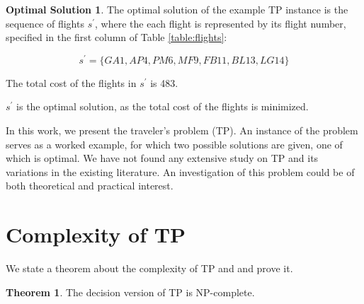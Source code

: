 \documentclass{article}
\theoremstyle{definition}
\newtheorem{theorem}{Theorem}
\newtheorem*{osolution}{Optimal Solution}
\begin{document}
\begin{osolution}
The optimal solution of the example TP instance is the sequence of flights $s^{\prime}$, where the each flight is represented by its flight number, specified in the first column of Table \ref{table:flights}:

$$ s^{\prime} = \{GA1, AP4, PM6, MF9, FB11, BL13, LG14\} $$

The total cost of the flights in $s^{\prime}$ is 483.

$s^{\prime}$ is the optimal solution, as the total cost of the flights is minimized.
\end{osolution}

In this work, we present the traveler's problem (TP). An instance of the problem serves as a worked example, for which two possible solutions are given, one of which is optimal. We have not found any extensive study on TP and its variations in the existing literature. An investigation of this problem could be of both theoretical and practical interest.

\section{Complexity of TP}

We state a theorem about the complexity of TP and and prove it.

\begin{theorem}
The decision version of TP is NP-complete.
\end{theorem}
\end{document}
